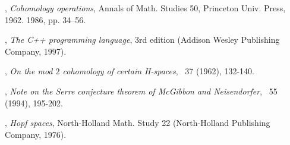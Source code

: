 \begin{thebibliography}{99}
, \textit{Cohomology operations}, Annals of Math. Studies 50, Princeton Univ. Press, 1962.
1986, pp. 34--56.

, \textit{The C++ programming language}, 3rd edition (Addison Wesley Publishing Company, 1997).

, \textit{On the mod $2$ cohomology of certain H-spaces}, \COMMH\ 37 (1962), 132-140.

, \textit{Note on the Serre conjecture theorem of McGibbon and Neisendorfer}, \TOPOA\ 55 (1994), 195-202.

, \textit{Hopf spaces}, North-Holland Math. Study 22 (North-Holland Publishing Company, 1976).

\end{thebibliography}
